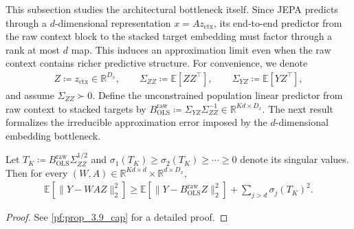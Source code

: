 This subsection studies the architectural bottleneck itself. Since JEPA predicts
through a $d$-dimensional representation $x = A z_{\mathrm{ctx}}$, its end-to-end
predictor from the raw context block to the stacked target embedding must factor
through a rank at most $d$ map. This induces an approximation limit even when
the raw context contains richer predictive structure.
For convenience, we denote
\begin{align*}
    Z \coloneqq z_{\mathrm{ctx}} \in \mathbb{R}^{D_x},
    \qquad
    \Sigma_{ZZ} \coloneqq \mathbb{E}[ZZ^\top],
    \qquad
    \Sigma_{YZ} \coloneqq \mathbb{E}[Y Z^\top],
\end{align*}
and assume $\Sigma_{ZZ} \succ 0$. 
Define the unconstrained population linear predictor from raw context to stacked targets by
    $B^{\mathrm{raw}}_{\mathrm{OLS}}
    \coloneqq
    \Sigma_{YZ}\Sigma_{ZZ}^{-1}
    \in \mathbb{R}^{Kd \times D_x}.$
The next result formalizes the irreducible approximation error imposed by the
$d$-dimensional embedding bottleneck.

\begin{proposition}
\label{prop:capacity_lower_bound}
Let $T_K \coloneqq B^{\mathrm{raw}}_{\mathrm{OLS}} \Sigma_{ZZ}^{1/2}$ and $\sigma_1(T_K) \ge \sigma_2(T_K) \ge \cdots \ge 0$ denote its singular
values. 
Then for every $(W, A) \in \mathbb{R}^{Kd \times d} \times \mathbb{R}^{d \times D_x}$,
\begin{align}
    \mathbb{E}\!\left[\|Y - W A Z\|_2^2\right]
    \ge
    \mathbb{E}\!\left[\|Y - B^{\mathrm{raw}}_{\mathrm{OLS}} Z\|_2^2\right]
    +
    \sum_{j>d} \sigma_j(T_K)^2.
    \label{eq:capacity_lower_bound}
\end{align}
\end{proposition}
\begin{proof}
See \cref{pf:prop_3.9_cap} for a detailed proof.
\end{proof}

